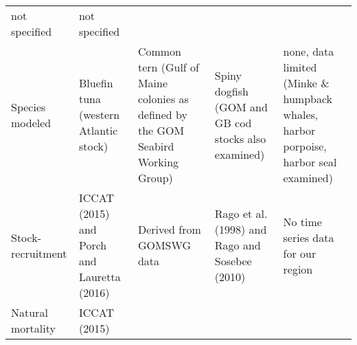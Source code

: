 \documentclass[]{article}
\begin{document}
\begin{longtable}[]{@{}lllll@{}}
\begin{minipage}[t]{0.17\columnwidth}
not specified\strut
\end{minipage} & \begin{minipage}[t]{0.17\columnwidth}\raggedright\strut
not specified\strut
\end{minipage}\tabularnewline
\begin{minipage}[t]{0.17\columnwidth}\raggedright\strut
Species modeled\strut
\end{minipage} & \begin{minipage}[t]{0.17\columnwidth}\raggedright\strut
Bluefin tuna (western Atlantic stock)\strut
\end{minipage} & \begin{minipage}[t]{0.17\columnwidth}\raggedright\strut
Common tern (Gulf of Maine colonies as defined by the GOM Seabird
Working Group)\strut
\end{minipage} & \begin{minipage}[t]{0.17\columnwidth}\raggedright\strut
Spiny dogfish (GOM and GB cod stocks also examined)\strut
\end{minipage} & \begin{minipage}[t]{0.17\columnwidth}\raggedright\strut
none, data limited (Minke \& humpback whales, harbor porpoise, harbor
seal examined)\strut
\end{minipage}\tabularnewline
\begin{minipage}[t]{0.17\columnwidth}\raggedright\strut
Stock-recruitment\strut
\end{minipage} & \begin{minipage}[t]{0.17\columnwidth}\raggedright\strut
ICCAT (2015) and Porch and Lauretta (2016)\strut
\end{minipage} & \begin{minipage}[t]{0.17\columnwidth}\raggedright\strut
Derived from GOMSWG data\strut
\end{minipage} & \begin{minipage}[t]{0.17\columnwidth}\raggedright\strut
Rago et al. (1998) and Rago and Sosebee (2010)\strut
\end{minipage} & \begin{minipage}[t]{0.17\columnwidth}\raggedright\strut
No time series data for our region\strut
\end{minipage}\tabularnewline
\begin{minipage}[t]{0.17\columnwidth}\raggedright\strut
Natural mortality\strut
\end{minipage} & \begin{minipage}[t]{0.17\columnwidth}\raggedright\strut
ICCAT (2015)\strut

\end{minipage}
\end{longtable}
\end{document}
